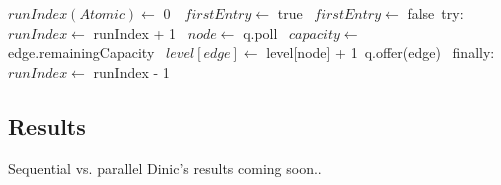         \begin{algorithmic}
            \State $runIndex(Atomic) \gets$ 0\
            \
                \State $firstEntry \gets$ true\
                    \State $firstEntry \gets$ false\
                    \State try:\
                        \State $runIndex \gets$ runIndex + 1\
                            \State $node \gets$ q.poll\
                                \State $capacity \gets$ edge.remainingCapacity\
                                    \State $level[edge] \gets$ level[node] + 1\
                                    \State q.offer(edge)\
                                \EndIf
                            \EndFor
                        \EndWhile    
                    \State finally:\
                        \State $runIndex \gets$ runIndex - 1\
                \EndWhile        
            \EndFunction
        \end{algorithmic}
        
\subsection{Results}   
Sequential vs. parallel Dinic's results coming soon..